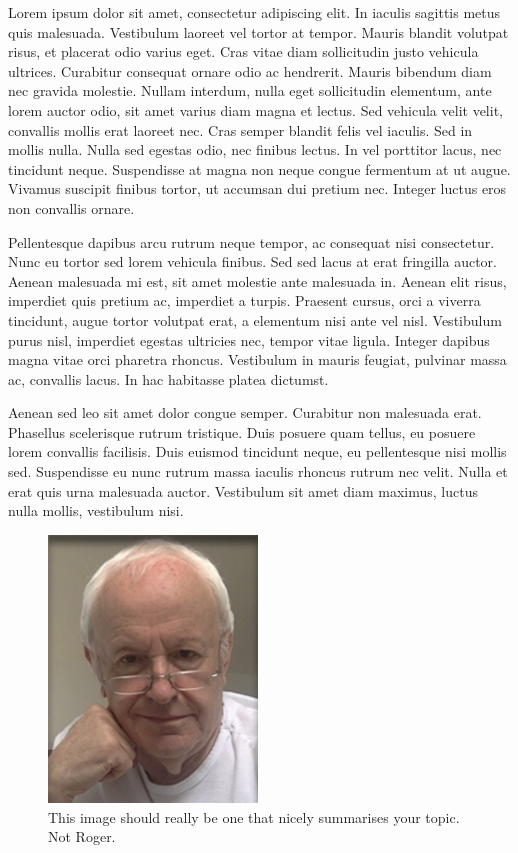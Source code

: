 \documentclass[12pt,]{book}
\begin{document}
Lorem ipsum dolor sit amet, consectetur adipiscing elit. In iaculis
sagittis metus quis malesuada. Vestibulum laoreet vel tortor at tempor.
Mauris blandit volutpat risus, et placerat odio varius eget. Cras vitae
diam sollicitudin justo vehicula ultrices. Curabitur consequat ornare
odio ac hendrerit. Mauris bibendum diam nec gravida molestie. Nullam
interdum, nulla eget sollicitudin elementum, ante lorem auctor odio, sit
amet varius diam magna et lectus. Sed vehicula velit velit, convallis
mollis erat laoreet nec. Cras semper blandit felis vel iaculis. Sed in
mollis nulla. Nulla sed egestas odio, nec finibus lectus. In vel
porttitor lacus, nec tincidunt neque. Suspendisse at magna non neque
congue fermentum at ut augue. Vivamus suscipit finibus tortor, ut
accumsan dui pretium nec. Integer luctus eros non convallis ornare.

Pellentesque dapibus arcu rutrum neque tempor, ac consequat nisi
consectetur. Nunc eu tortor sed lorem vehicula finibus. Sed sed lacus at
erat fringilla auctor. Aenean malesuada mi est, sit amet molestie ante
malesuada in. Aenean elit risus, imperdiet quis pretium ac, imperdiet a
turpis. Praesent cursus, orci a viverra tincidunt, augue tortor volutpat
erat, a elementum nisi ante vel nisl. Vestibulum purus nisl, imperdiet
egestas ultricies nec, tempor vitae ligula. Integer dapibus magna vitae
orci pharetra rhoncus. Vestibulum in mauris feugiat, pulvinar massa ac,
convallis lacus. In hac habitasse platea dictumst.

Aenean sed leo sit amet dolor congue semper. Curabitur non malesuada
erat. Phasellus scelerisque rutrum tristique. Duis posuere quam tellus,
eu posuere lorem convallis facilisis. Duis euismod tincidunt neque, eu
pellentesque nisi mollis sed. Suspendisse eu nunc rutrum massa iaculis
rhoncus rutrum nec velit. Nulla et erat quis urna malesuada auctor.
Vestibulum sit amet diam maximus, luctus nulla mollis, vestibulum nisi.

\begin{figure}
\includegraphics[width=2.19in]{assets/RPF-thumbnail} \caption{This image should really be one that nicely summarises your topic. Not Roger.}\label{fig:maineff}
\end{figure}
\end{document}
